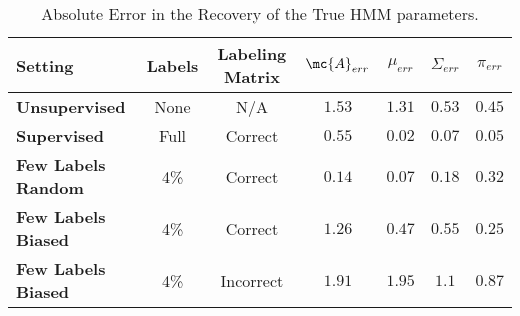 \begin{table}[!htb]
   \centering 
   \caption{Absolute Error in the Recovery of the True HMM parameters.}
   \label{table:hmm_cases}
   \begin{tabular}{l c c c c c c  }
     \toprule 
     Setting&      Labels&      Labeling Matrix&      $\mc{A}_{err}$&      $\mu_{err}$&      $\Sigma_{err}$& $\pi_{err}$\\ 
     \midrule 
     \textbf{Unsupervised} &None &N/A &$1.53$  &$1.31$  &$0.53$  &$0.45$  \\ 
     \textbf{Supervised} &Full &Correct &$0.55$  &$0.02$  &$0.07$  &$0.05$  \\ 
     \textbf{Few Labels Random} &4\% &Correct &$0.14$  &$0.07$  &$0.18$  &$0.32$  \\ 
     \textbf{Few Labels Biased} &4\% &Correct &$1.26$  &$0.47$  &$0.55$  &$0.25$  \\ 
     \textbf{Few Labels Biased} &4\% &Incorrect &$1.91$  &$1.95$  &$1.1$  &$0.87$  \\ 
     \bottomrule 
 
   \end{tabular} 
\end{table}